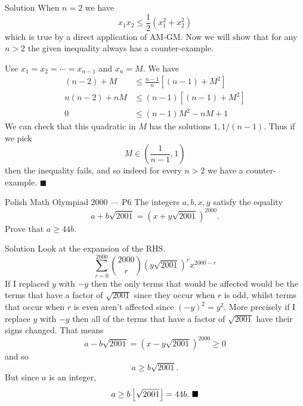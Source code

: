 \documentclass{article}
\begin{document}
\begin{solution}{Solution}
When $n = 2$ we have
$$
x_1 x_2 \leq \frac12 \left( x_1^2 + x_2^2 \right)
$$
which is true by a direct application of AM-GM. Now we will show that
for any $n > 2$ the given inequality always has a counter-example.
\vspace{0.2cm}

Use $x_1 = x_2 = \cdots = x_{n-1}$ and $x_n = M$. We have
\[
\begin{aligned}
(n-2) + M &\leq \frac{n-1}{n} \left[ (n-1) + M^2 \right] \\
n(n-2) + n M &\leq (n-1)\left[ (n-1) + M^2 \right] \\
0 &\leq (n-1)M^2 - n M + 1
\end{aligned}
\]
We can check that this quadratic in $M$ has the solutions $1, 1/(n-1)$.
Thus if we pick
$$
M \in \left(\frac{1}{n-1}, 1\right)
$$
then the inequality fails, and so indeed for every $n > 2$ we have a
counter-example. $\blacksquare$
\end{solution}
\newpage

\begin{problem}{Polish Math Olympiad 2000 --- P6}
The integers $a,b,x,y$ satisfy the equality
$$
a + b\sqrt{2001} = \left( x + y\sqrt{2001} \right)^{2000}.
$$
Prove that $a \geq 44b$.
\end{problem}

\begin{solution}{Solution}
Look at the expansion of the RHS.
$$
\sum_{r=0}^{2000} \binom{2000}{r} \left( y\sqrt{2001} \right)^r x^{2000 - r}
$$
If I replaced $y$ with $-y$ then the only terms that would be affected
would be the terms that have a factor of $\sqrt{2001}$ since they occur
when $r$ is odd, whilst terms that occur when $r$ is even aren't affected
since $(-y)^2 = y^2$. More precisely if I replace $y$ with $-y$ then
all of the terms that have a factor of $\sqrt{2001}$ have their signs
changed. That means
$$
a - b\sqrt{2001} = \left(x - y\sqrt{2001}\right)^{2000} \geq 0
$$
and so
$$
a \geq b\sqrt{2001}.
$$
But since $a$ is an integer,
$$
a \geq b \left\lfloor  \sqrt{2001}  \right\rfloor = 44 b. \ \blacksquare
$$
\end{solution}
\end{document}
